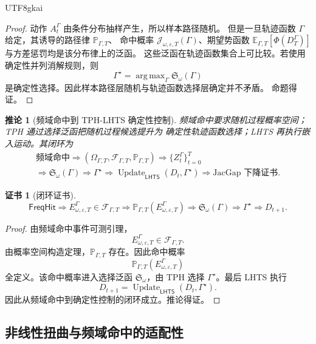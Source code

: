 \documentclass[12pt]{article}
\newtheorem{corollary}{推论}[section]
\newtheorem{Certificate}{证书}[section]
\newcommand{\LHTS}{\ensuremath{\mathsf{LHTS}}}
\newcommand{\FreqHit}{\ensuremath{\mathsf{FreqHit}}}
\newcommand{\Prob}{\mathbb P}
\newcommand{\E}{\mathbb E}
\DeclareMathOperator{\Update}{Update}
\DeclareMathOperator*{\argmax}{arg\,max}
\begin{document}
\begin{CJK*}{UTF8}{gkai}
\begin{proof}
动作 \(A_t^\Gamma\) 由条件分布抽样产生，所以样本路径随机。
但是一旦轨迹函数 \(\Gamma\) 给定，其诱导的路径律 \(\Prob_{\Gamma,T}\)、
命中概率 \(\mathcal J_{\omega,\varepsilon,T}(\Gamma)\)、期望势函数
\(\E_{\Gamma,T}[\Phi(D_T^\Gamma)]\) 与方差惩罚均是该分布律上的泛函。
这些泛函在轨迹函数集合上可比较。若使用确定性并列消解规则，则
\[
\Gamma^\star=\argmax_{\Gamma}\mathfrak S_\omega(\Gamma)
\]
是确定性选择。因此样本路径层随机与轨迹函数选择层确定并不矛盾。
命题得证。
\end{proof}

\begin{corollary}[频域命中到 TPH-LHTS 确定性控制]
频域命中要求随机过程概率空间；TPH 通过选择泛函把随机过程候选提升为
确定性轨迹函数选择；LHTS 再执行嵌入运动。其闭环为
\[
\boxed{
\begin{gathered}
\text{频域命中}
\Rightarrow
(\Omega_{\Gamma,T},\mathscr F_{\Gamma,T},\Prob_{\Gamma,T})
\Rightarrow
\{Z_t^\Gamma\}_{t=0}^{T}
\\
\Rightarrow
\mathfrak S_\omega(\Gamma)
\Rightarrow
\Gamma^\star
\Rightarrow
\Update_{\LHTS}(D_t,\Gamma^\star)
\Rightarrow
\text{JacGap 下降证书}.
\end{gathered}
}
\]
\end{corollary}

\begin{Certificate}[闭环证书]
\[
\boxed{
\FreqHit
\Rightarrow
E_{\omega,\varepsilon,T}^{\Gamma}\in\mathscr F_{\Gamma,T}
\Rightarrow
\Prob_{\Gamma,T}(E_{\omega,\varepsilon,T}^{\Gamma})
\Rightarrow
\mathfrak S_\omega(\Gamma)
\Rightarrow
\Gamma^\star
\Rightarrow
D_{t+1}.
}
\]
\end{Certificate}

\begin{proof}
由频域命中事件可测引理，
\[
E_{\omega,\varepsilon,T}^{\Gamma}\in\mathscr F_{\Gamma,T}.
\]
由概率空间构造定理，\(\Prob_{\Gamma,T}\) 存在。因此命中概率
\[
\Prob_{\Gamma,T}(E_{\omega,\varepsilon,T}^{\Gamma})
\]
全定义。该命中概率进入选择泛函 \(\mathfrak S_\omega\)，由 TPH 选择
\(\Gamma^\star\)。最后 LHTS 执行
\[
D_{t+1}=\Update_{\LHTS}(D_t,\Gamma^\star).
\]
因此从频域命中到确定性控制的闭环成立。推论得证。
\end{proof}

\subsection{非线性扭曲与频域命中的适配性}
\label{subsec:nonlinear-twist-frequency-fit}


\end{CJK*}
\end{document}
